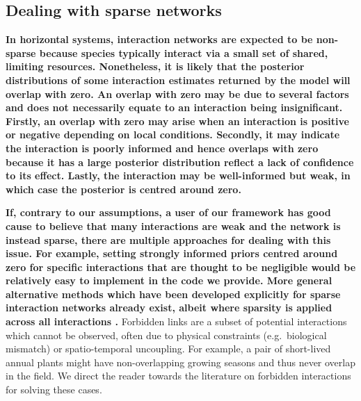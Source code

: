 \documentclass[a4,12pt]{article}
\begin{document}
\begin{refsection}



    \subsection{Dealing with sparse networks}
    \label{meth:sparse}

    \textbf{In horizontal systems, interaction networks are expected to be non-sparse because species typically interact via a small set of shared, limiting resources. Nonetheless, it is likely that the posterior distributions of some interaction estimates returned by the model will overlap with zero. An overlap with zero may be due to several factors and does not necessarily equate to an interaction being insignificant. Firstly, an overlap with zero may arise when an interaction is positive or negative depending on local conditions. Secondly, it may indicate the interaction is poorly informed and hence overlaps with zero because it has a large posterior distribution reflect a lack of confidence to its effect. Lastly, the interaction may be well-informed but weak, in which case the posterior is centred around zero.}

    \textbf{If, contrary to our assumptions, a user of our framework has good cause to believe that many interactions are weak and the network is instead sparse, there are multiple approaches for dealing with this issue. For example, setting strongly informed priors centred around zero for specific interactions that are thought to be negligible would be relatively easy to implement in the code we provide. More general alternative methods which have been developed explicitly for sparse interaction networks already exist, albeit where sparsity is applied across all interactions \parencite{Weiss-Lehman2022}.} Forbidden links are a subset of potential interactions which cannot be observed, often due to physical constraints (e.g.\ biological mismatch) or spatio-temporal uncoupling. For example, a pair of short-lived annual plants might have non-overlapping growing seasons and thus never overlap in the field. We direct the reader towards the literature on forbidden interactions \parencite{Olesen2011, Jordano2016} for solving these cases. 


\end{refsection}
\end{document}
